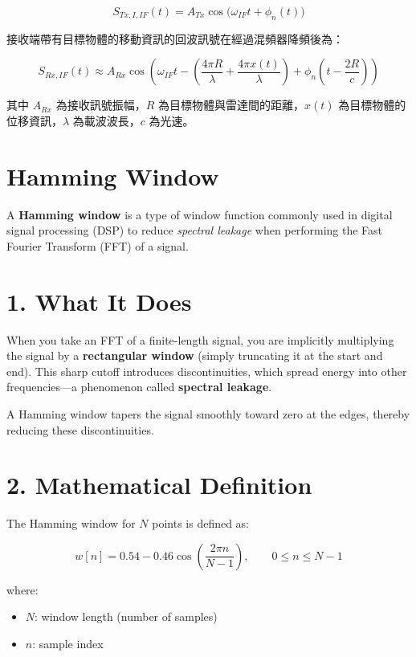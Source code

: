 \documentclass{article}
\begin{document}
\begin{equation}
S_{Tx,I,IF}(t) = A_{Tx}\cos\!\big(\omega_{IF}t + \phi_n(t)\big)
\tag{2.37}
\end{equation}

接收端帶有目標物體的移動資訊的回波訊號在經過混頻器降頻後為：

\begin{equation}
S_{Rx,IF}(t) \approx A_{Rx} \cos\!\left(\omega_{IF}t - \left(\frac{4\pi R}{\lambda} + \frac{4\pi x(t)}{\lambda}\right) + \phi_n\!\left(t - \frac{2R}{c}\right)\right)
\tag{2.38}
\end{equation}

其中 $A_{Rx}$ 為接收訊號振幅，$R$ 為目標物體與雷達間的距離，$x(t)$ 為目標物體的位移資訊，$\lambda$ 為載波波長，$c$ 為光速。
\section*{Hamming Window}

A \textbf{Hamming window} is a type of window function commonly used in digital signal processing (DSP) to reduce \textit{spectral leakage} when performing the Fast Fourier Transform (FFT) of a signal.

\section*{1. What It Does}

When you take an FFT of a finite-length signal, you are implicitly multiplying the signal by a \textbf{rectangular window} (simply truncating it at the start and end).  
This sharp cutoff introduces discontinuities, which spread energy into other frequencies---a phenomenon called \textbf{spectral leakage}.

A Hamming window tapers the signal smoothly toward zero at the edges, thereby reducing these discontinuities.

\section*{2. Mathematical Definition}

The Hamming window for \(N\) points is defined as:

\[
w[n] = 0.54 - 0.46 \cos\!\left(\frac{2 \pi n}{N-1}\right),
\qquad 0 \leq n \leq N-1
\]

where:
\begin{itemize}[nosep]
    \item \(N\): window length (number of samples)
    \item \(n\): sample index
\end{itemize}
\end{document}
